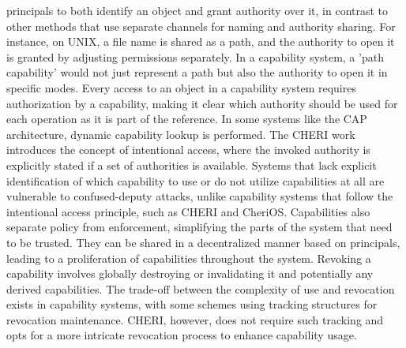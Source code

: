 principals to both identify an object and grant authority over it, in contrast to other methods that use separate channels for 
naming and authority sharing. For instance, on UNIX, a file name is shared as a path, and the authority to open it is 
granted by adjusting permissions separately. In a capability system, a 'path capability' would not just represent a 
path but also the authority to open it in specific modes.
\newline
Every access to an object in a capability system requires authorization by a capability, making 
it clear which authority should be used for each operation as it is part of the reference. 
In some systems like the CAP architecture, dynamic capability lookup is performed. 
The CHERI work introduces the concept of intentional access, where the invoked authority 
is explicitly stated if a set of authorities is available. Systems that lack explicit 
identification of which capability to use or do not utilize capabilities at all are 
vulnerable to confused-deputy attacks, unlike capability systems that follow the 
intentional access principle, such as CHERI and CheriOS.
\newline
Capabilities also separate policy from enforcement, simplifying the parts of the 
system that need to be trusted. They can be shared in a decentralized manner 
based on principals, leading to a proliferation of capabilities throughout 
the system. Revoking a capability involves globally destroying or invalidating 
it and potentially any derived capabilities. The trade-off between the complexity 
of use and revocation exists in capability systems, with some schemes using 
tracking structures for revocation maintenance. CHERI, however, does not require 
such tracking and opts for a more intricate revocation process to enhance capability usage.
\newline


